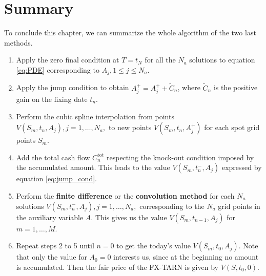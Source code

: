 \section{Summary}
\label{sec:methods:summary}
To conclude this chapter, we can summarize the whole algorithm of the two last methods.
\begin{enumerate}
\item Apply the zero final condition at $T = t_N$ for all the $N_a$ solutions to equation \eqref{eq:PDE} corresponding to $A_j, 1\leq j\leq N_a$.
\item Apply the jump condition to obtain $A^+_j = A^+_j + \tilde{C}_n$, where $\tilde{C}_n$ is the positive gain on the fixing date $t_n$.
\item Perform the cubic spline interpolation from points $V(S_m,t_n,A_j), j = 1,\ldots,N_a,$ to new points $V(S_m,t_n,A^+_j)$ for each spot grid points $S_m$.

\item Add the total cash flow $C^\text{tot}_n$ respecting the knock-out condition imposed by the accumulated amount. This leads to the value $V(S_m,t_n^-,A_j)$ expressed by equation \eqref{eq:jump_cond}.

\item Perform the \textbf{finite difference} or the \textbf{convolution method} for each $N_a$ solutions $V(S_m,t_n^-,A_j),j=1,\ldots,N_a,$ corresponding to the $N_a$ grid points in the auxiliary variable $A$. This gives us the value $V(S_m,t_{n-1},A_j)$ for $m=1,\ldots,M$.

\item Repeat steps 2 to 5 until $n = 0$ to get the today's value $V(S_m,t_0,A_j)$. Note that only the value for $A_0 = 0$ interests us, since at the beginning no amount is accumulated. Then the fair price of the FX-TARN is given by $V(S,t_0,0)$.
\end{enumerate}